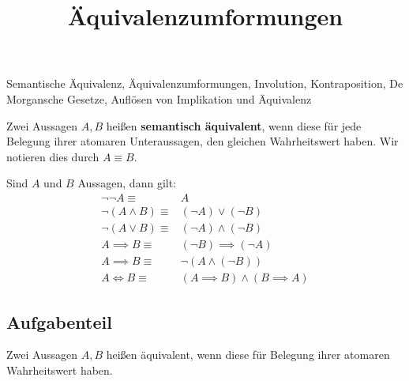 \documentclass{uebungsblatt}
\title{Äquivalenzumformungen}
\begin{document}
\maketitle
\begin{contents}
    Semantische Äquivalenz, Äquivalenzumformungen, Involution, Kontraposition, De Morgansche Gesetze, Auflösen von Implikation und Äquivalenz
\end{contents}


\begin{definition}
    Zwei Aussagen $A,B$ heißen \textbf{semantisch äquivalent}, wenn diese für jede Belegung ihrer atomaren Unteraussagen, den gleichen Wahrheitswert haben. Wir notieren dies durch $A \equiv B$.
\end{definition}

\begin{theorem}
    Sind $A$ und $B$ Aussagen, dann gilt:
    \begin{align*}
        \tag{Involution}
        \lnot \lnot A \equiv& A\\
        \tag{1. De Morgansches Gesetz}
        \lnot (A \land B) \equiv& (\lnot A) \lor (\lnot B)\\
        \tag{2. De Morgansches Gesetz}
        \lnot (A \lor B) \equiv& (\lnot A) \land (\lnot B)\\
        \tag{Kontraposition}
        A \implies B \equiv& (\lnot B) \implies (\lnot A)\\
        \tag{Auflösen der Implikation}
        A \implies B \equiv & \lnot (A \land (\lnot B))\\
        \tag{Auflösen der Äquivalenz}
        A \iff B \equiv & (A \implies B) \land (B \implies A)
    \end{align*}
\end{theorem}

\subsection*{Aufgabenteil}

\begin{exercise}
    Zwei Aussagen $A,B$ heißen  äquivalent, wenn diese für
     Belegung ihrer atomaren  
     Wahrheitswert haben.
\end{exercise}
\end{document}

